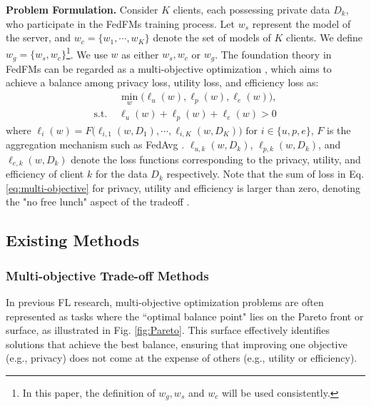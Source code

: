 \textbf{Problem Formulation.}
Consider \(K\) clients, each possessing private data \(D_k\), who participate in the FedFMs training process. Let \(w_s\) represent the model of the server, and \(w_c=\{w_1,\cdots,w_K\}\) denote the set of models of \(K\) clients. We define \(w_g = \{w_s, w_c\}\)\footnote{In this paper, the definition of $w_g,w_s$ and $w_c$ will be used consistently.
}.  We use $w$ as either $w_s, w_c$ or $w_g$. The foundation theory in FedFMs can be regarded as a multi-objective optimization \cite{kang2023optimizing,zhang2022no}, which aims to achieve a balance among privacy loss, utility loss, and efficiency loss as:
\begin{equation}
    \begin{split}
      &\min_{w}\Big( \ell_u(w), \ell_p(w), \ell_e(w) \Big), \\
\text{s.t. } &\ell_u(w) + \ell_p(w) + \ell_e(w) >0   
    \end{split}\label{eq:multi-objective}
\end{equation} 
$\text{where } \ell_i(w) = F\Big(\ell_{i,1}(w,D_1),\cdots, \ell_{i,K}(w,D_K))$ $ \text{for } i\in\{u,p,e\}$, $F$ is the aggregation mechanism such as FedAvg \cite{mcmahan2017communication}.  \(\ell_{u,k}(w,D_k)\), \(\ell_{p,k}(w,D_k)\), and \(\ell_{e,k}(w,D_k)\) denote the loss functions corresponding to the privacy, utility, and efficiency of client \(k\) for the data \(D_k\) respectively. Note that the sum of loss in Eq. \eqref{eq:multi-objective} for privacy, utility and efficiency is larger than zero, denoting the "no free lunch" aspect of the tradeoff \cite{zhang2022no}.


\subsection{Existing Methods}

\subsubsection{Multi-objective Trade-off Methods}

In previous FL research, multi-objective optimization problems are often represented as tasks where the “optimal balance point" lies on the Pareto front or surface, as illustrated in Fig. \ref{fig:Pareto}. This surface effectively identifies solutions that achieve the best balance, ensuring that improving one objective (e.g., privacy) does not come at the expense of others (e.g., utility or efficiency). 

